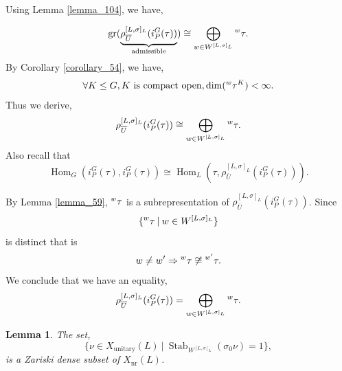 \documentclass[8pt]{article}
\newtheorem{lemma}{Lemma}[section]
\DeclareMathOperator{\Stab}{Stab}
\DeclareMathOperator{\unitary}{unitary}
\DeclareMathOperator{\Hom}{Hom}
\DeclareMathOperator{\gr}{gr}
\DeclareMathOperator{\nr}{nr}
\newcommand{\sep}[0]{\:|\:}
\begin{document}
Using Lemma \ref{lemma_104}, we have,

\begin{equation*}
\gr(\underbrace{\rho_{\overline{U}}^{[L,\sigma]_L}(i_P^G(\tau))}_{\text{admissible}}) \cong \bigoplus_{w\in W^{[L,\sigma]_L}}\prescript{w}{}{\tau}.
\end{equation*}
By Corollary \ref{corollary_54}, we have,
\begin{equation*}
  \forall K\leq G,\text{$K$ is compact open}, \dim(\prescript{w}{}{\tau}^K)<\infty.
\end{equation*}
Thus we derive,
\begin{equation*}
  \rho_{\overline{U}}^{[L,\sigma]_L}(i_P^G(\tau)) \cong \bigoplus_{w\in W^{[L,\sigma]_L}}\prescript{w}{}{\tau}.
\end{equation*}
Also recall that 
\begin{equation*}
\Hom_G(i_P^G(\tau),i_P^G(\tau)) \cong \Hom_L(\tau,\rho_{\overline{U}}^{[L,\sigma]_L}(i_P^G(\tau))).
\end{equation*}

By Lemma \ref{lemma_59}, $\prescript{w}{}{\tau}$ is a subrepresentation of $\rho_{\overline{U}}^{[L,\sigma]_L}(i_P^G(\tau))$. Since 
\begin{equation*}
\{\prescript{w}{}{\tau}\sep w\in W^{[L,\sigma]_L}\}
\end{equation*}
is distinct that is 
\begin{equation*}
  w\not=w' \Rightarrow \prescript{w}{}{\tau}\not\cong\prescript{w'}{}{\tau}.
\end{equation*}
We conclude that we have an equality,
\begin{equation*}
  \rho_{\overline{U}}^{[L,\sigma]_L}(i_P^G(\tau))=\bigoplus_{w\in W^{[L,\sigma]_L}}\prescript{w}{}{\tau}.
\end{equation*}
\begin{lemma}
  \label{lemma_106}
  The set,
  \begin{equation*}
    \{\nu\in X_{\unitary}(L)\sep \Stab_{W^{[L,\sigma]_L}}(\sigma_0\nu)=1\},
  \end{equation*}
  is a Zariski dense subset of $X_{\nr}(L)$.
\end{lemma}

  \setcounter{claim}{0}
\end{document}
